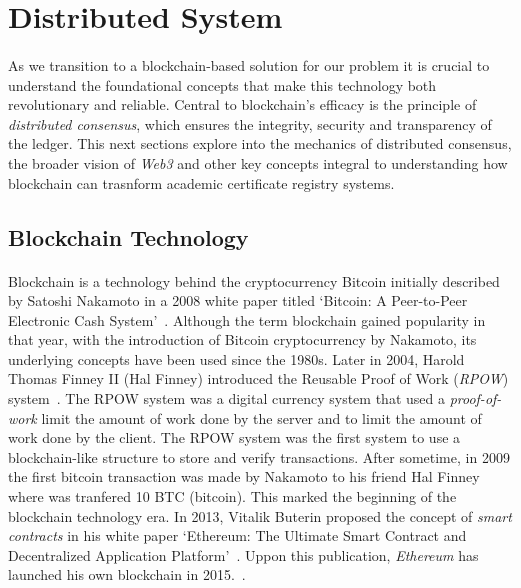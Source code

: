 \section{Distributed System}\label{sec:distributed-systems}
\paragraph{}

As we transition to a blockchain-based solution for our problem it is crucial to understand the foundational concepts that make this technology both revolutionary and reliable.
Central to blockchain's efficacy is the principle of \textit{distributed consensus}, which ensures the integrity, security and transparency of the ledger.
This next sections explore into the mechanics of distributed consensus, the broader vision of \textit{Web3} and other key concepts integral to understanding how blockchain can trasnform
academic certificate registry systems.

\subsection*{Blockchain Technology}\label{subsec:blockchain}
\paragraph{}

Blockchain is a technology behind the cryptocurrency Bitcoin initially described by Satoshi Nakamoto in a 2008 white paper titled `Bitcoin: A Peer-to-Peer Electronic Cash System'~\cite{nakamoto2008bitcoin}.
Although the term blockchain gained popularity in that year, with the introduction of Bitcoin cryptocurrency by Nakamoto, its underlying concepts have been used since the 1980s.
Later in 2004, Harold Thomas Finney II (Hal Finney) introduced the Reusable Proof of Work (\textit{RPOW}) system~\cite{RPOW}. The RPOW system was a digital
currency system that used a \textit{proof-of-work} limit the amount of work done by the server and to limit the amount of work done by the client.
The RPOW system was the first system to use a blockchain-like structure to store and verify transactions. After sometime, in 2009 the first bitcoin transaction was made by Nakamoto
to his friend Hal Finney~\cite{peterson2014hal} where was tranfered 10 BTC (bitcoin). This marked the beginning of the blockchain technology era.
In 2013, Vitalik Buterin proposed the concept of \textit{smart contracts} in his white paper `Ethereum: The Ultimate Smart Contract and Decentralized Application Platform'~\cite{buterin2013ethereum}. Uppon this publication,
\textit{Ethereum} has launched his own blockchain in 2015.~\cite{reiff2020bitcoin}.

